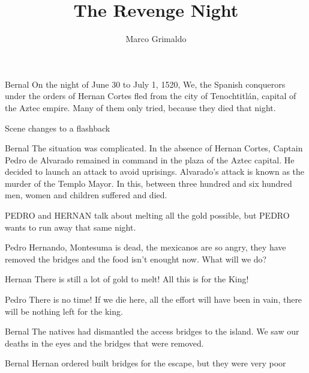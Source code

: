 \documentclass{screenplay}[2020/03/06]
\title{The Revenge Night}
\author{Marco Grimaldo}
\begin{document}
\coverpage
\fadein
{}

\begin{dialogue}{Bernal}
On the night of June 30 to July 1, 1520, We, the Spanish conquerors under the orders of Hernan Cortes fled from the city of Tenochtitlán, capital of the Aztec empire. Many of them only tried, because they died that night.
\end{dialogue}

Scene changes to a flashback

\begin{dialogue}{Bernal}
The situation was complicated. In the absence of Hernan Cortes, Captain Pedro de Alvarado remained in command in the plaza of the Aztec capital. He decided to launch an attack to avoid uprisings. Alvarado's attack is known as the murder of the Templo Mayor. In this, between three hundred and six hundred men, women and children suffered and died.
\end{dialogue}


PEDRO and HERNAN talk about melting all the gold possible, but PEDRO wants to run away that same night.

\begin{dialogue}{Pedro}
Hernando, Montesuma is dead, the mexicanos are so angry, they have removed the bridges and the food isn't enought now. What will we do?
\end{dialogue}

\begin{dialogue}{Hernan}
There is still a lot of gold to melt! All this is for the King!
\end{dialogue}

\begin{dialogue}{Pedro}
There is no time! If we die here, all the effort will have been in vain, there will be nothing left for the king.
\end{dialogue}


\begin{dialogue}{Bernal}
The natives had dismantled the access bridges to the island. We saw our deaths in the eyes and the bridges that were removed.
\end{dialogue}


\begin{dialogue}{Bernal}
Hernan ordered built bridges for the escape, but they were very poor
\end{dialogue}
\end{document}
